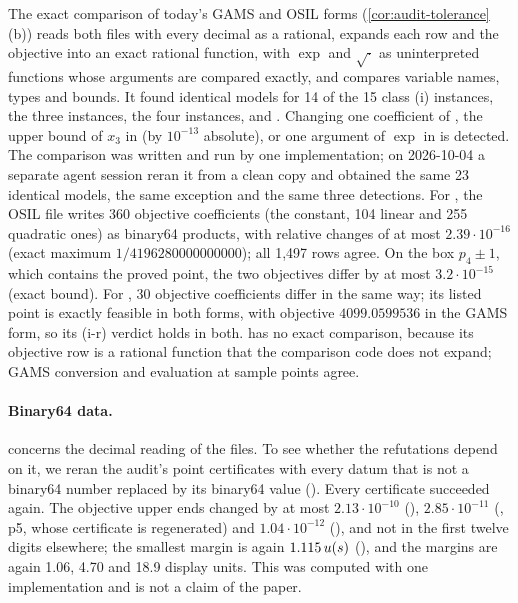 The exact comparison of today's GAMS and OSIL forms (\cref{cor:audit-tolerance}(b)) reads both files with every decimal as a rational, expands each row and the objective into an exact rational function, with $\exp$ and $\sqrt{\cdot}$ as uninterpreted functions whose arguments are compared exactly, and compares variable names, types and bounds.
It found identical models for 14 of the 15 class (i) instances, the three  instances, the four  instances,  and .
Changing one coefficient of , the upper bound of $x_3$ in  (by $10^{-13}$ absolute), or one argument of $\exp$ in  is detected.
The comparison was written and run by one implementation; on 2026-10-04 a separate agent session reran it from a clean copy and obtained the same 23 identical models, the same  exception and the same three detections.
For , the OSIL file writes 360 objective coefficients (the constant, 104 linear and 255 quadratic ones) as binary64 products, with relative changes of at most $2.39\cdot10^{-16}$ (exact maximum $1/4196280000000000$); all 1,497 rows agree.
On the box $p_4\pm1$, which contains the proved point, the two objectives differ by at most $3.2\cdot10^{-15}$ (exact bound).
For , 30 objective coefficients differ in the same way; its listed point is exactly feasible in both forms, with objective $4099.0599536$ in the GAMS form, so its (i-r) verdict holds in both.
 has no exact comparison, because its objective row is a rational function that the comparison code does not expand; GAMS conversion and evaluation at sample points agree.

\paragraph{Binary64 data.}
 concerns the decimal reading of the files.
To see whether the refutations depend on it, we reran the audit's point certificates with every datum that is not a binary64 number replaced by its binary64 value ().
Every certificate succeeded again.
The objective upper ends changed by at most $2.13\cdot10^{-10}$ (), $2.85\cdot10^{-11}$ (, p5, whose certificate is regenerated) and $1.04\cdot10^{-12}$ (), and not in the first twelve digits elsewhere; the smallest margin is again $1.115\,u(s)$ (), and the  margins are again 1.06, 4.70 and 18.9 display units.
This was computed with one implementation and is not a claim of the paper.

